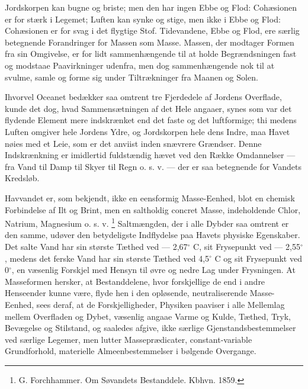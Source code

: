 \documentclass[12pt,a4paper]{book}
\renewcommand{\thefootnote}{*)}
\begin{document}
Jordskorpen kan bugne og briste; men den har ingen Ebbe og Flod:
Cohæsionen er for stærk i Legemet; Luften kan synke og stige, men ikke i
Ebbe og Flod: Cohæsionen er for svag i det flygtige Stof. Tidevandene,
Ebbe og Flod, ere særlig betegnende Forandringer for Massen som Masse.
Massen, der modtager Formen fra sin Omgivelse, er for lidt
sammenhængende til at holde Begrændsningen fast og modstaae
Paavirkninger udenfra, men dog sammenhængende nok til at svulme, samle og
forme sig under Tiltrækninger fra Maanen og Solen.

Ihvorvel Oceanet bedækker saa omtrent tre Fjerdedele af Jordens
Overflade, kunde det dog, hvad Sammensætningen af det Hele angaaer, synes
som var det flydende Element mere indskrænket end det faste og det
luftformige; thi medens Luften omgiver hele Jordens Ydre, og Jordskorpen
hele dens Indre, maa Havet nøies med et Leie, som er det anviist inden
snævrere Grændser. Denne Indskrænkning er imidlertid fuldstændig hævet
ved den Række Omdannelser --- fra Vand til Damp til Skyer til Regn
o. s. v. --- der er saa betegnende for Vandets Kredsløb.

Havvandet er, som bekjendt, ikke en eensformig Masse-Eenhed, blot en
chemisk Forbindelse af Ilt og Brint, men en saltholdig concret Masse,
indeholdende Chlor, Natrium, Magnesium o. s. v.%
\renewcommand{\thefootnote}{**)}%
\footnote{%
G. Forchhammer. Om Søvandets Bestanddele. Kbhvn. 1859.}%
\renewcommand{\thefootnote}{*)}
Saltmængden, der i alle Dybder saa omtrent er den samme, udøver den
betydeligste Indflydelse paa Havets physiske Egenskaber. Det salte Vand
har sin største
Tæthed ved --- 2,67$^{\circ}$ C, sit Frysepunkt ved --- 2,55$^{\circ}$,
medens det ferske Vand har sin største Tæthed ved 4,5$^{\circ}$ C og sit
Frysepunkt ved 0$^{\circ}$, en væsenlig Forskjel med Hensyn til øvre og
nedre Lag under Frysningen. At Masseformen hersker, at Bestanddelene,
hvor forskjellige de end i andre Henseender kunne være, flyde hen i den
opløsende, neutraliserende Masse-Eenhed, sees deraf, at de
Forskjelligheder, Physiken paaviser i alle Mellemlag mellem Overfladen og
Dybet, væsenlig angaae Varme og Kulde, Tæthed, Tryk, Bevægelse og
Stilstand, og saaledes afgive, ikke særlige Gjenstandsbestemmelser ved
særlige Legemer, men lutter Masseprædicater, constant-variable
Grundforhold, materielle Almeenbestemmelser i bølgende Overgange.
\end{document}
